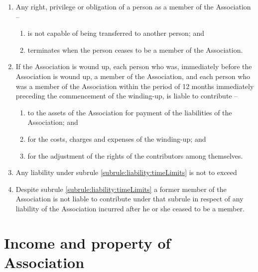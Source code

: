 \documentclass[a4paper,11pt]{article}
\begin{document}
\begin{enumerate}
	\item Any right, privilege or obligation of a person as a member of the Association --
	\begin{enumerate}
		\item is not capable of being transferred to another person; and
		\item terminates when the person ceases to be a member of the Association.
	\end{enumerate}
	
	\item \label{subrule:liability:timeLimits} If the Association is wound up, each person who was, immediately before the Association is wound up, a member of the Association, and each person who was a member of the Association within the period of 12 months immediately preceding the commencement of the winding-up, is liable to contribute --
	\begin{enumerate}
		\item to the assets of the Association for payment of the liabilities of the Association; and
		\item for the costs, charges and expenses of the winding-up; and
		\item for the adjustment of the rights of the contributors among themselves.
	\end{enumerate}
	
	\item Any liability under subrule \ref{subrule:liability:timeLimits} is not to exceed \orgLiabilityLimit{}
	\item Despite subrule \ref{subrule:liability:timeLimits} a former member of the Association is not liable to contribute under that subrule in respect of any liability of the Association incurred after he or she ceased to be a member.
	
\end{enumerate}

\section{Income and property of Association}
\label{rule:income}
\end{document}
